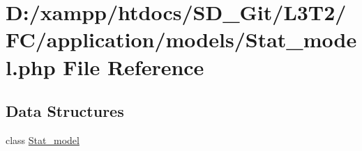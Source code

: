 \hypertarget{_stat__model_8php}{}\section{D\+:/xampp/htdocs/\+S\+D\+\_\+\+Git/\+L3\+T2/\+F\+C/application/models/\+Stat\+\_\+model.php File Reference}
\label{_stat__model_8php}
\subsection*{Data Structures}
\begin{DoxyCompactItemize}
\item 
class \hyperlink{class_stat__model}{Stat\+\_\+model}
\end{DoxyCompactItemize}
